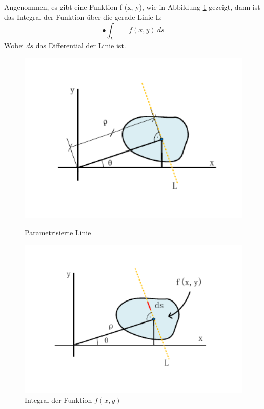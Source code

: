 Angenommen, es gibt eine Funktion f (x, y), wie in Abbildung \ref{fig:Integral der Funktion f (x, y)} gezeigt, dann ist das Integral der Funktion über die gerade Linie L:
\begin{equation}
•  \int_{L}= f(x,y)\ ds
\end{equation} 
Wobei $ ds $ das Differential der Linie ist. 

\begin{figure}[H]
\centering 
\begin{minipage}[b]{0.49\textwidth} 
\centering 
\includegraphics[width=1.0\textwidth]{images/4_ZweiteErfahrung/Radon/1.pdf} 
\caption{Parametrisierte Linie}
\label{fig:Parametrisierte Linie}
\end{minipage}
\begin{minipage}[b]{0.49\textwidth} 
\centering 
\includegraphics[width=1.0\textwidth]{images/4_ZweiteErfahrung/Radon/2.pdf}
\caption{Integral der Funktion $ f(x,y) $}
\label{fig:Integral der Funktion f (x, y)}
\end{minipage}
\end{figure}

